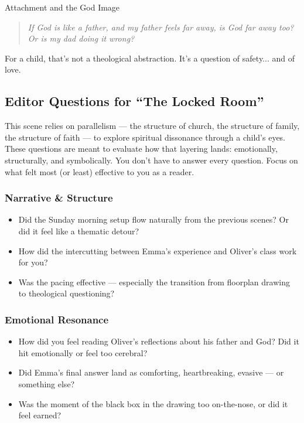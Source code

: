 \begin{PsychologicalSidebar}{Attachment and the God Image}
    \begin{quote}
    \textit{If God is like a father, and my father feels far away, is God far away too?}  
    \textit{Or is my dad doing it wrong?}
    \end{quote}
    
    For a child, that’s not a theological abstraction. It’s a question of safety... and of love.
    
\end{PsychologicalSidebar}


\subsection*{Editor Questions for ``The Locked Room''}

This scene relies on parallelism — the structure of church, the structure of family, the structure of faith — to explore spiritual dissonance through a child’s eyes. These questions are meant to evaluate how that layering lands: emotionally, structurally, and symbolically. You don’t have to answer every question. Focus on what felt most (or least) effective to you as a reader.

\subsubsection*{Narrative \& Structure}

\begin{itemize}
  \item Did the Sunday morning setup flow naturally from the previous scenes? Or did it feel like a thematic detour?
  \item How did the intercutting between Emma’s experience and Oliver’s class work for you?
  \item Was the pacing effective — especially the transition from floorplan drawing to theological questioning?
\end{itemize}

\subsubsection*{Emotional Resonance}

\begin{itemize}
  \item How did you feel reading Oliver’s reflections about his father and God? Did it hit emotionally or feel too cerebral?
  \item Did Emma’s final answer land as comforting, heartbreaking, evasive — or something else?
  \item Was the moment of the black box in the drawing too on-the-nose, or did it feel earned?
\end{itemize}

